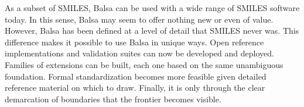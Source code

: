 \documentclass{article}
\begin{document}
As a subset of SMILES, Balsa can be used with a wide range of SMILES software today. In this sense, Balsa may seem to offer nothing new or even of value. However, Balsa has been defined at a level of detail that SMILES never was. This difference makes it possible to use Balsa in unique ways. Open reference implementations and validation suites can now be developed and deployed. Families of extensions can be built, each one based on the same unambiguous foundation. Formal standardization becomes more feasible given detailed reference material on which to draw. Finally, it is only through the clear demarcation of boundaries that the frontier becomes visible.

\clearpage
\printbibliography
\end{document}
